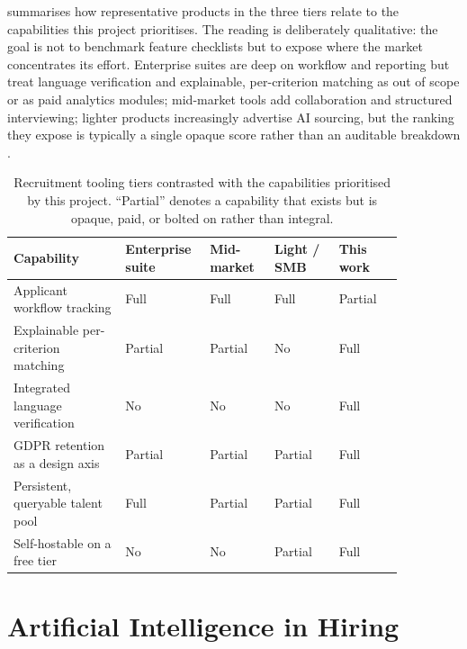  summarises how representative products in the
three tiers relate to the capabilities this project prioritises. The reading
is deliberately qualitative: the goal is not to benchmark feature checklists
but to expose where the market concentrates its effort. Enterprise suites are
deep on workflow and reporting but treat language verification and
explainable, per-criterion matching as out of scope or as paid analytics
modules; mid-market tools add collaboration and structured interviewing;
lighter products increasingly advertise AI sourcing, but the ranking they
expose is typically a single opaque score rather than an auditable breakdown
\parencite{Faliagka2012Ranking}.

\begin{table}[H]
\centering
\caption[Recruitment tooling tiers versus prioritised capabilities]{Recruitment
tooling tiers contrasted with the capabilities prioritised by this project.
``Partial'' denotes a capability that exists but is opaque, paid, or bolted on
rather than integral.}
\label{tab:ats-comparison}
\begin{tabular}{p{0.26\linewidth}p{0.15\linewidth}p{0.15\linewidth}p{0.15\linewidth}p{0.15\linewidth}}
\toprule
\textbf{Capability} & \textbf{Enterprise suite} & \textbf{Mid-market} & \textbf{Light / SMB} & \textbf{This work} \\
\midrule
Applicant workflow tracking & Full & Full & Full & Partial \\
Explainable per-criterion matching & Partial & Partial & No & Full \\
Integrated language verification & No & No & No & Full \\
GDPR retention as a design axis & Partial & Partial & Partial & Full \\
Persistent, queryable talent pool & Full & Partial & Partial & Full \\
Self-hostable on a free tier & No & No & Partial & Full \\
\bottomrule
\end{tabular}
\end{table}


\section{Artificial Intelligence in Hiring}
\label{sec:sota-ai}

